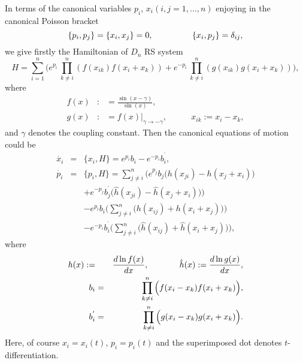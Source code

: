 \documentclass[a4paper,12pt]{article}
\begin{document}
In terms of the canonical variables $p_{i}$, $x_{i}(i,j=1,\ldots ,n)$
enjoying in the canonical Poisson bracket
\begin{equation}
\{p_{i},p_{j}\}=\{x_{i},x_{j}\}=0,\mbox{$ \ \ \ \ \ \ \ \ \ \ \ \ \ \ $}%
\{x_{i},p_{j}\}=\delta _{ij},  \label{poisson}
\end{equation}
we give firstly the Hamiltonian of $D_{n}$ RS system
\begin{equation}
H=\sum_{i=1}^{n}\Big(e^{p_{i}}\,\prod_{k\neq
i}^{n}(f(x_{ik})f(x_{i}+x_{k}))+e^{-p_{i}}\,\prod_{k\neq
i}^{n}(g(x_{ik})g(x_{i}+x_{k}))\Big),  \label{hami}
\end{equation}
where
\begin{eqnarray}
f(x) &:&=\frac{\sin (x-\gamma )}{\sin (x)},  \nonumber \\
g(x) &:&=f(x)|_{\gamma \rightarrow -\gamma
},~~~~~~~~~~~~~x_{ik}:=x_{i}-x_{k},
\end{eqnarray}
and $\gamma $ denotes the coupling constant. Then the canonical equations of
motion could be
\begin{eqnarray}
\dot{x_{i}} &=&\{x_{i},H\}=e^{p_{i}}b_{i}-e^{-p_{i}}b_{i}^{^{\prime }},
\label{equ1} \\
\dot{p_{i}} &=&\{p_{i},H\}=\sum_{j\neq i}^{n}\Big(e^{p_{j}}b_{j}\big(%
h(x_{ji})-h(x_{j}+x_{i})\big)  \nonumber \\
&&+e^{-p_{j}}b_{j}^{^{\prime }}\big(\hat{h}(x_{ji})-\hat{h}(x_{j}+x_{i})\big)%
\Big)  \nonumber \\
&&-e^{p_{i}}b_{i}\Big(\sum_{j\neq i}^{n}\big(h(x_{ij})+h(x_{i}+x_{j})\big)%
\Big)  \nonumber \\
&&-e^{-p_{i}}b_{i}^{^{\prime }}\Big(\sum_{j\neq i}^{n}\big(\hat{h}(x_{ij})+%
\hat{h}(x_{i}+x_{j})\big)\Big),  \label{equ2}
\end{eqnarray}
where
\begin{eqnarray}
h(x):= &&\frac{d\ln f(x)}{dx},\mbox{$ \ \ \ \ \ \ \ \ \ \ \ $}\hat{h}(x):=%
\frac{d\ln g(x)}{dx},  \nonumber \\
b_{i} &=&\,\prod_{k\neq i}^{n}\Big(f(x_{i}-x_{k})f(x_{i}+x_{k})\Big),
\nonumber \\
b_{i}^{^{\prime }} &=&\,\prod_{k\neq i}^{n}\Big(g(x_{i}-x_{k})g(x_{i}+x_{k})%
\Big).
\end{eqnarray}
Here,\vspace{1pt} of course $x_{i}=x_{i}(t)$, $p_{i}=p_{i}(t)$ and the
superimposed dot denotes $t$-differentiation.
\end{document}
